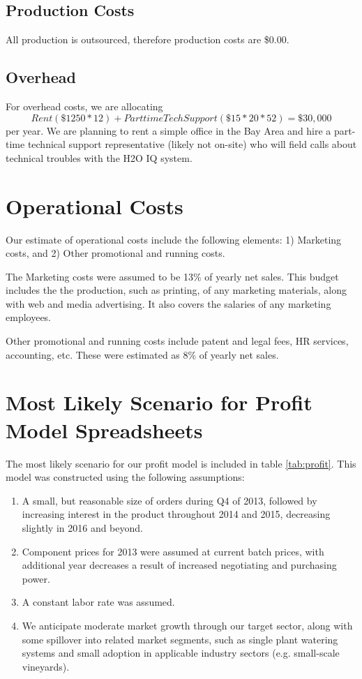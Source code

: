 \documentclass[11pt]{article}
\begin{document}
\subsection{Production Costs}

All production is outsourced, therefore production costs are \$0.00.

\subsection{Overhead}

For overhead costs, we are allocating $$Rent (\$1250 * 12) + Parttime Tech Support (\$15*20*52) = \$30,000$$ per year.  We are planning to rent a simple office in the Bay Area and hire a part-time technical support representative (likely not on-site) who will field calls about technical troubles with the H2O IQ system.

\section{Operational Costs}

Our estimate of operational costs include the following elements: 1) Marketing costs, and 2) Other promotional and running costs.

The Marketing costs were assumed to be 13\% of yearly net sales. This budget includes the the production, such as printing, of any marketing materials, along with web and media advertising. It also covers the salaries of any marketing employees.

Other promotional and running costs include patent and legal fees, HR services, accounting, etc. These were estimated as 8\% of yearly net sales.

\section{Most Likely Scenario for Profit Model Spreadsheets}

The most likely scenario for our profit model is included in table \ref{tab:profit}. This model was constructed using the following assumptions:
\begin{enumerate}
\item A small, but reasonable size of orders during Q4 of 2013, followed by increasing interest in the product throughout 2014 and 2015, decreasing slightly in 2016 and beyond.
\item Component prices for 2013 were assumed at current batch prices, with additional year decreases a result of increased negotiating and purchasing power.
\item A constant labor rate was assumed.
\item We anticipate moderate market growth through our target sector, along with some spillover into related market segments, such as single plant watering systems and small adoption in applicable industry sectors (e.g. small-scale vineyards).
\end{enumerate}
\end{document}
